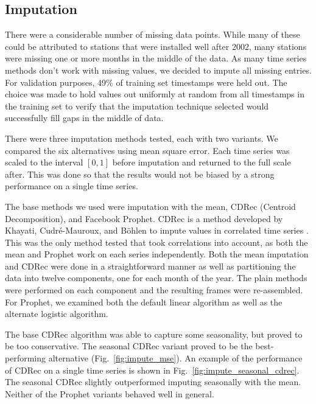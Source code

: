 \documentclass[9pt,twocolumn,twoside, lineno]{jost-new}
\numberwithin{subsection}{section}
\begin{document}
\subsection{Imputation}\label{subsec:imputation}
There were a considerable number of missing data points.
While many of these could be attributed to stations that were installed well after 2002, many stations were missing one
or more months in the middle of the data.
As many time series methods don't work with missing values, we decided to impute all missing entries.
For validation purposes, 49\% of training set timestamps were held out.
The choice was made to hold values out uniformly at random from all timestamps in the training set to verify that the
imputation technique selected would successfully fill gaps in the middle of data.

There were three imputation methods tested, each with two variants.
We compared the six alternatives using mean square error.
Each time series was scaled to the interval $[0,1]$ before imputation and returned to the full scale after.
This was done so that the results would not be biased by a strong performance on a single time series.

The base methods we used were imputation with the mean, CDRec (Centroid Decomposition), and Facebook Prophet.
CDRec is a method developed by Khayati, Cudré-Mauroux, and Böhlen to impute values in correlated time series \cite{khayati}.
This was the only method tested that took correlations into account, as both the mean and Prophet work on each series independently.
Both the mean imputation and CDRec were done in a straightforward manner as well as partitioning the data into twelve components, one for each month of the year.
The plain methods were performed on each component and the resulting frames were re-assembled.
For Prophet, we examined both the default linear algorithm as well as the alternate logistic algorithm.

The base CDRec algorithm was able to capture some seasonality, but proved to be too conservative.
The seasonal CDRec variant proved to be the best-performing alternative (Fig.~\ref{fig:impute_mse}).
An example of the performance of CDRec on a single time series is shown in Fig.~\ref{fig:impute_seasonal_cdrec}.
The seasonal CDRec slightly outperformed imputing seasonally with the mean.
Neither of the Prophet variants behaved well in general.
\end{document}
